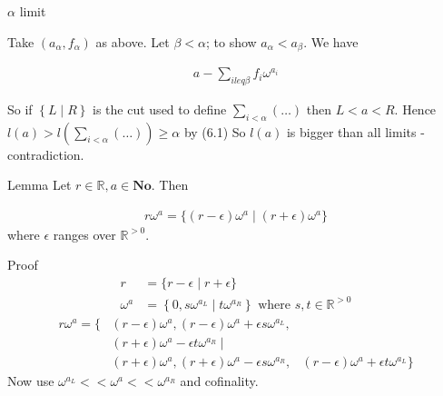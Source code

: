 \documentclass{article}
\newcommand{\R}{\mathbb{R}}
\newcommand{\No}{\mathbf{No}}
\newcommand{\paren}[1]{\left( #1 \right)}
\newcommand{\curly}[1]{\left\{ #1 \right\}}
\newcommand{\w}{\omega}
\begin{document}
$\alpha$ limit

Take $(a_\alpha, f_\alpha)$ as above.
Let $\beta < \alpha$; to show $a_\alpha < a_\beta$.
We have

\begin{align*}
	a - \sum_{i leq \beta} f_i \w^{a_i}
\end{align*}

So if $\curly{L \mid R}$ is the cut used to define $\sum_{i < \alpha} (\ldots)$ then $L < a < R$.
Hence $l(a) > l\paren{\sum_{i < \alpha} (\ldots)} \geq \alpha$ by (6.1)
So $l(a)$ is bigger than all limits - contradiction.

Lemma Let $r \in \R, a \in \No$. Then 

\begin{align*}
	r\w^a = \{(r - \epsilon) \w^a \mid (r+\epsilon)\w^a\}
\end{align*}
where $\epsilon$ ranges over $\R^{>0}$.

Proof
\begin{align*}
	r &= \{r - \epsilon \mid r + \epsilon\} \\
	\w^a &= \curly{0, s\w^{a_L} \mid t\w^{a_R}} \text{ where } s,t \in \R^{>0}
\end{align*}
\begin{align*}
	r\w^a = \{
	&(r - \epsilon) \w^a, (r - \epsilon)\w^a + \epsilon s \w^{a_L}, \\
	&(r + \epsilon) \w^a - \epsilon t \w^{a_R} \mid \\
	&(r + \epsilon) \w^a, (r + \epsilon)\w^a - \epsilon s \w^{a_R},
	&(r - \epsilon) \w^a + \epsilon t \w^{a_L} \}
\end{align*}
Now use $\w^{a_L} << \w^a << \w^{a_R}$ and cofinality.
\end{document}
